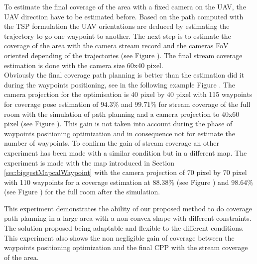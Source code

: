 To estimate the final coverage of the area with a fixed camera on the UAV, the UAV direction have to be estimated before. 
Based on the path computed with the TSP formulation the UAV orientations are deduced by estimating the trajectory to go one waypoint to another.
The next step is to estimate the coverage of the area with the camera stream  record and the cameras FoV oriented depending of the trajectories (see Figure ). The final stream coverage estimation is done with the camera size 60x40 pixel. \\
Obviously the final coverage path planning is better than the estimation did it during the waypoints positioning, see  in the following example Figure . The camera projection for the optimisation  is 40 pixel by 40 pixel with 115 waypoints for coverage pose estimation of $94.3\%$ and $99.71\%$ for stream coverage of the full room with the simulation of path planning and a camera projection to 40x60 pixel (see Figure ). This gain is not taken into account during the phase of waypoints positioning optimization and in consequence not for estimate the number of waypoints.%
To confirm the gain of stream coverage an other experiment has been made with a similar condition but in a different map. The experiment is made with the map introduced in Section \ref{sec:biggestMapcalWaypoint} with the camera projection of 70 pixel by 70 pixel with 110 waypoints for a coverage estimation at 88.38\%  (see Figure ) and 98.64\% (see Figure ) for the full room after the simulation.

This experiment demonstrates the ability of our proposed method to do coverage path planning in a large area with a non convex shape with different constraints. The solution proposed being adaptable and flexible to the different conditions. This experiment also shows the non negligible gain of coverage between the waypoints positioning optimization and the final CPP with the stream coverage of the area.




